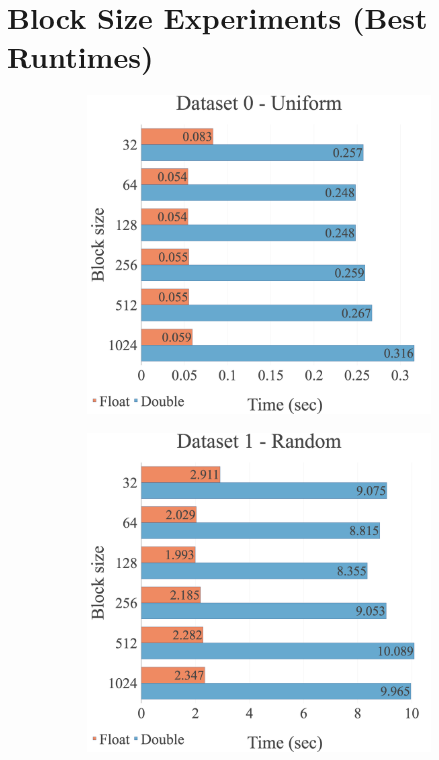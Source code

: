 \section{Block Size Experiments (Best Runtimes)}
\label{appendix:option:block}
\begin{figure}[H]
\begin{adjustwidth}{-2cm}{-2cm}
\centering
\begin{subfigure}{.62\textwidth}
    \centering
    \includegraphics[width=1\textwidth]{img/experiments/option-blocks-0_UNIFORM.png}
\end{subfigure}
\begin{subfigure}{.62\textwidth}
    \centering
    \includegraphics[width=1\textwidth]{img/experiments/option-blocks-1_RAND.png}

\end{subfigure}
\end{adjustwidth}
\end{figure}

